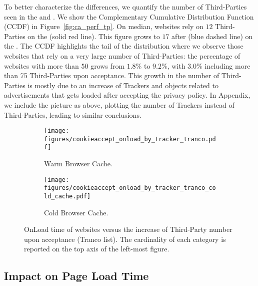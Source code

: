To better characterize the differences, we quantify the number of Third-Parties seen in the \BEFORE and \AFTER. We show the Complementary Cumulative Distribution Function (CCDF) in Figure~\ref{fig:ca_perf_tp}. On median, websites rely on $12$ Third-Parties on the \BEFORE (solid red line). This figure grows to $17$ after (blue dashed line) on the \AFTER. The CCDF highlights the tail of the distribution where we observe those websites that rely on a very large number of Third-Parties: the percentage of websites with more than $50$ grows from $1.8\%$ to $9.2\%$, with $3.0\%$ including more than 75 Third-Parties upon acceptance. This growth in the number of Third-Parties is mostly due to an increase of Trackers and objects related to advertisements that gets loaded after accepting the privacy policy. In Appendix, we include the picture as above, plotting the number of Trackers instead of Third-Parties, leading to similar conclusions.


\begin{figure}[!t]
    \centering
    \begin{subfigure}[t]{0.495\columnwidth}
        \texttt{[image: figures/cookieaccept\_onload\_by\_tracker\_tranco.pdf]}
        \caption{Warm Browser Cache.}
        \label{fig:ca_onload_warm}
    \end{subfigure}
    \begin{subfigure}[t]{0.495\columnwidth}
        \texttt{[image: figures/cookieaccept\_onload\_by\_tracker\_tranco\_cold\_cache.pdf]}
        \caption{Cold Browser Cache.}
        \label{fig:ca_onload_cold}
    \end{subfigure}
    \caption{OnLoad time of websites versus the increase of Third-Party number upon acceptance (Tranco list). The cardinality of each category is reported on the top axis of the left-most figure.}
     \label{fig:ca_onload}
\end{figure}

\subsection{Impact on Page Load Time}

